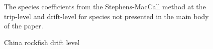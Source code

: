 \documentclass[
  12pt,
  authoryear,
  preprint,
  3p]{elsarticle}
\begin{document}
\begin{figure}
\begin{minipage}[t]{0.50\linewidth}
{{}

\caption{China rockfish drift level}

}

\end{minipage}%
\newline
\begin{minipage}[t]{0.50\linewidth}

{\centering 

The species coefficients from the Stephens-MacCall method at the
trip-level and drift-level for species not presented in the main body of
the paper.

}

\end{minipage}%

\end{figure}


  
\end{document}
